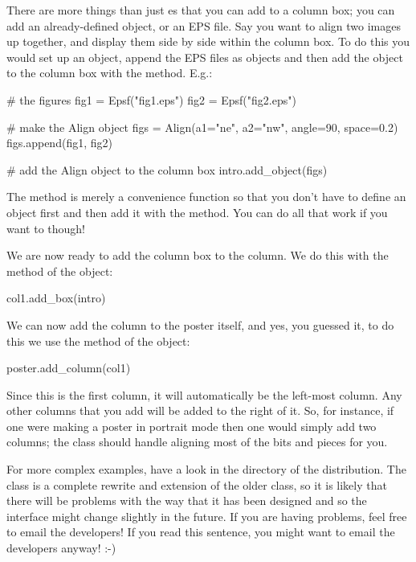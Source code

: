 There are more things than just es that you can add to a column
box; you can add an already-defined \pyscript object, or an EPS file.  Say
you want to align two images up together, and display them side by side
within the column box.  To do this you would set up an  object,
append the EPS files as  objects and then add the 
object to the column box with the  method.  E.g.:
\begin{python}
# the figures
fig1 = Epsf("fig1.eps")
fig2 = Epsf("fig2.eps")

# make the Align object
figs = Align(a1="ne", a2="nw", angle=90, space=0.2)
figs.append(fig1, fig2)

# add the Align object to the column box
intro.add_object(figs)
\end{python}

The  method is merely a convenience function so that you
don't have to define an  object first and then add it with the
 method.  You can do all that work if you want to though!

We are now ready to add the column box to the column.  We do this with the
 method of the  object:
\begin{python}
col1.add_box(intro)
\end{python}

We can now add the column to the poster itself, and yes, you guessed it, to
do this we use the  method of the  object:
\begin{python}
poster.add_column(col1)
\end{python}
Since this is the first column, it will automatically be the left-most
column.  Any other columns that you add will be added to the right of it.
So, for instance, if one were making a poster in portrait mode then one
would simply add two columns; the  class should handle
aligning most of the bits and pieces for you.

For more complex examples, have a look in the  directory of
the \pyscript distribution.  The  class is a complete rewrite
and extension of the older  class, so it is likely that
there will be problems with the way that it has been designed and so the
interface might change slightly in the future.  If you are having problems,
feel free to email the developers!  If you read this sentence, you might
want to email the developers anyway!  :-)

